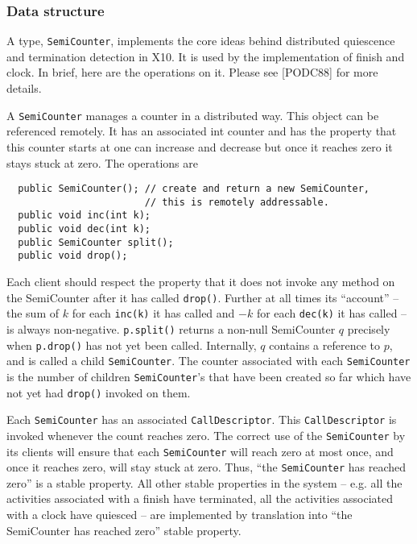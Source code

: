 \subsubsection{Data structure}

A type, {\tt SemiCounter}, implements the core ideas behind distributed
quiescence and termination detection in X10. It is used by the
implementation of finish and clock. In brief, here are the operations
on it. Please see [PODC88] for more details.

A {\tt SemiCounter} manages a counter in a distributed way. This object can
be referenced remotely. It has an associated int counter and has the
property that this counter starts at one can increase and decrease but
once it reaches zero it stays stuck at zero.  The operations are

\begin{verbatim}
  public SemiCounter(); // create and return a new SemiCounter, 
                        // this is remotely addressable.
  public void inc(int k);
  public void dec(int k);
  public SemiCounter split();
  public void drop();
\end{verbatim}

Each client should respect the property that it does not invoke any
method on the SemiCounter after it has called {\tt drop()}. Further at
all times its ``account'' -- the sum of $k$ for each {\tt inc(k)} it
has called and $-k$ for each {\tt dec(k)} it has called -- is always
non-negative.  {\tt p.split()} returns a non-null SemiCounter $q$ precisely
when {\tt p.drop()} has not yet been called. Internally, $q$ contains a
reference to $p$, and is called a child {\tt SemiCounter}.  The counter
associated with each {\tt SemiCounter} is the number of children
{\tt SemiCounter}'s that have been created so far which have not yet had
{\tt drop()} invoked on them.

Each {\tt SemiCounter} has an associated {\tt CallDescriptor}. This
{\tt CallDescriptor} is invoked whenever the count reaches zero. The
correct use of the {\tt SemiCounter} by its clients will ensure that each
{\tt SemiCounter} will reach zero at most once, and once it reaches zero,
will stay stuck at zero. Thus, ``the {\tt SemiCounter} has reached zero'' is a
stable property. All other stable properties in the system -- e.g. all
the activities associated with a finish have terminated, all the
activities associated with a clock have quiesced -- are implemented by
translation into ``the SemiCounter has reached zero'' stable property.

